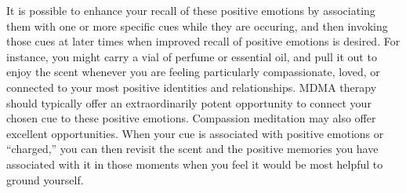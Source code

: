 \documentclass[12pt,letterpaper]{article}
\begin{document}
It is possible to enhance your recall of these positive emotions by associating them with one or more specific cues while they are occuring, and then invoking those cues at later times when improved recall of positive emotions is desired. For instance, you might carry a vial of perfume or essential oil, and pull it out to enjoy the scent whenever you are feeling particularly compassionate, loved, or connected to your most positive identities and relationships. MDMA therapy should typically offer an extraordinarily potent opportunity to connect your chosen cue to these positive emotions. Compassion meditation may also offer excellent opportunities. When your cue is associated with positive emotions or “charged,” you can then revisit the scent and the positive memories you have associated with it in those moments when you feel it would be most helpful to ground yourself.
\end{document}
